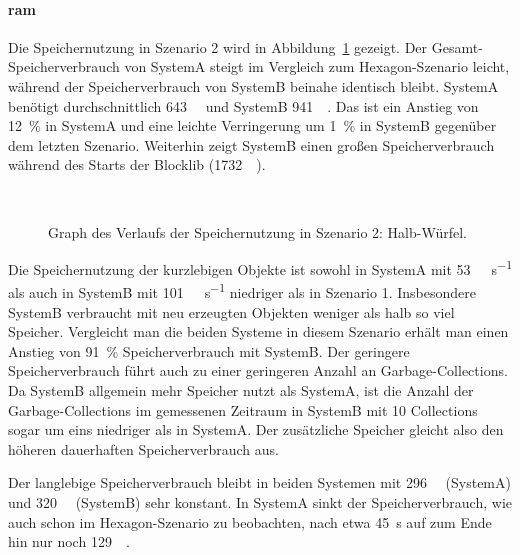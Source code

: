 \paragraph{\ac{ram}} Die Speichernutzung in Szenario 2 wird in Abbildung~\ref{fig:seed-0-cube-mem} gezeigt. Der Ge\-samt-Spei\-cher\-ver\-brauch von SystemA steigt im Vergleich zum Hexagon-Szenario leicht, während der Speicherverbrauch von SystemB beinahe identisch bleibt. SystemA benötigt durchschnittlich \SI{643}{\mega\byte} und SystemB \SI{941}{\mega\byte}. Das ist ein Anstieg von \SI{12}{\percent} in SystemA und eine leichte Verringerung um \SI{1}{\percent} in SystemB gegenüber dem letzten Szenario. Weiterhin zeigt SystemB einen großen Speicherverbrauch während des Starts der Blocklib (\SI{1732}{\mega\byte}).

\begin{figure}[!htb]
	\\
	\caption{Graph des Verlaufs der Speichernutzung in Szenario 2: Halb-Würfel.}\label{fig:seed-0-cube-mem}
\end{figure} 

Die Speichernutzung der kurzlebigen Objekte ist sowohl in SystemA mit \SI{53}{\mega\byte\per\second} als auch in SystemB mit \SI{101}{\mega\byte\per\second} niedriger als in Szenario 1. Insbesondere SystemB verbraucht mit neu erzeugten Objekten weniger als halb so viel Speicher. Vergleicht man die beiden Systeme in diesem Szenario erhält man einen Anstieg von \SI{91}{\percent} Speicherverbrauch mit SystemB. Der geringere Speicherverbrauch führt auch zu einer geringeren Anzahl an Garbage-Collections. Da SystemB allgemein mehr Speicher nutzt als SystemA, ist die Anzahl der Garbage-Collections im gemessenen Zeitraum in SystemB mit 10 Collections sogar um eins niedriger als in SystemA. Der zusätzliche Speicher gleicht also den höheren dauerhaften Speicherverbrauch aus. 

Der langlebige Speicherverbrauch bleibt in beiden Systemen mit \SI{296}{\mega\byte} (SystemA) und \SI{320}{\mega\byte} (SystemB) sehr konstant. In SystemA sinkt der Speicherverbrauch, wie auch schon im Hexagon-Szenario zu beobachten, nach etwa \SI{45}{\second} auf zum Ende hin nur noch \SI{129}{\mega\byte}.